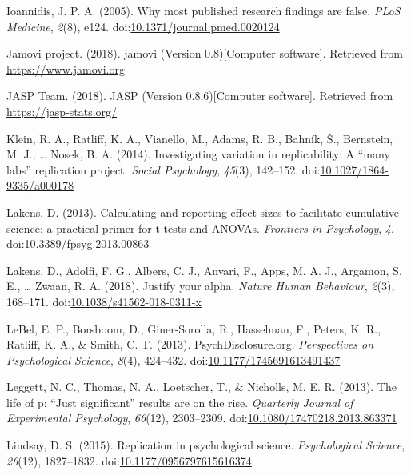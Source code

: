 \documentclass[english,,man]{apa6}
\theoremstyle{definition}
\theoremstyle{definition}
\theoremstyle{definition}
\theoremstyle{remark}
\begin{document}
\hypertarget{ref-Ioannidis2005}{}
Ioannidis, J. P. A. (2005). Why most published research findings are
false. \emph{PLoS Medicine}, \emph{2}(8), e124.
doi:\href{https://doi.org/10.1371/journal.pmed.0020124}{10.1371/journal.pmed.0020124}

\hypertarget{ref-jamovi2018}{}
Jamovi project. (2018). jamovi (Version 0.8){[}Computer software{]}.
Retrieved from \url{https://www.jamovi.org}

\hypertarget{ref-JASP2018}{}
JASP Team. (2018). JASP (Version 0.8.6){[}Computer software{]}.
Retrieved from \url{https://jasp-stats.org/}

\hypertarget{ref-Klein2014c}{}
Klein, R. A., Ratliff, K. A., Vianello, M., Adams, R. B., Bahník, Š.,
Bernstein, M. J., \ldots{} Nosek, B. A. (2014). Investigating variation
in replicability: A ``many labs'' replication project. \emph{Social
Psychology}, \emph{45}(3), 142--152.
doi:\href{https://doi.org/10.1027/1864-9335/a000178}{10.1027/1864-9335/a000178}

\hypertarget{ref-Lakens2013}{}
Lakens, D. (2013). Calculating and reporting effect sizes to facilitate
cumulative science: a practical primer for t-tests and ANOVAs.
\emph{Frontiers in Psychology}, \emph{4}.
doi:\href{https://doi.org/10.3389/fpsyg.2013.00863}{10.3389/fpsyg.2013.00863}

\hypertarget{ref-Lakens2018}{}
Lakens, D., Adolfi, F. G., Albers, C. J., Anvari, F., Apps, M. A. J.,
Argamon, S. E., \ldots{} Zwaan, R. A. (2018). Justify your alpha.
\emph{Nature Human Behaviour}, \emph{2}(3), 168--171.
doi:\href{https://doi.org/10.1038/s41562-018-0311-x}{10.1038/s41562-018-0311-x}

\hypertarget{ref-LeBel2013}{}
LeBel, E. P., Borsboom, D., Giner-Sorolla, R., Hasselman, F., Peters, K.
R., Ratliff, K. A., \& Smith, C. T. (2013). PsychDisclosure.org.
\emph{Perspectives on Psychological Science}, \emph{8}(4), 424--432.
doi:\href{https://doi.org/10.1177/1745691613491437}{10.1177/1745691613491437}

\hypertarget{ref-Leggett}{}
Leggett, N. C., Thomas, N. A., Loetscher, T., \& Nicholls, M. E. R.
(2013). The life of p: ``Just significant'' results are on the rise.
\emph{Quarterly Journal of Experimental Psychology}, \emph{66}(12),
2303--2309.
doi:\href{https://doi.org/10.1080/17470218.2013.863371}{10.1080/17470218.2013.863371}

\hypertarget{ref-Lindsay2015}{}
Lindsay, D. S. (2015). Replication in psychological science.
\emph{Psychological Science}, \emph{26}(12), 1827--1832.
doi:\href{https://doi.org/10.1177/0956797615616374}{10.1177/0956797615616374}
\end{document}
